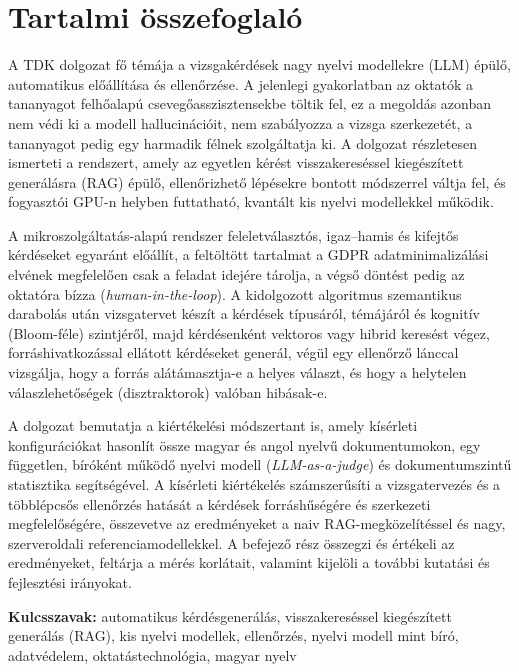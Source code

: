 \chapter*{Tartalmi összefoglaló}
\thispagestyle{plain}

A TDK dolgozat fő témája a vizsgakérdések nagy nyelvi modellekre (LLM) épülő, automatikus előállítása és
ellenőrzése. A jelenlegi gyakorlatban az oktatók a tananyagot felhőalapú csevegőasszisztensekbe töltik fel, ez
a megoldás azonban nem védi ki a modell hallucinációit, nem szabályozza a vizsga szerkezetét, a tananyagot
pedig egy harmadik félnek szolgáltatja ki. A dolgozat részletesen ismerteti a \Mimir{} rendszert, amely az
egyetlen kérést visszakereséssel kiegészített generálásra (RAG) épülő, ellenőrizhető lépésekre bontott
módszerrel váltja fel, és fogyasztói GPU-n helyben futtatható, kvantált kis nyelvi modellekkel működik.

A mikroszolgáltatás-alapú rendszer feleletválasztós, igaz--hamis és kifejtős kérdéseket egyaránt előállít, a
feltöltött tartalmat a GDPR adatminimalizálási elvének megfelelően csak a feladat idejére tárolja, a végső
döntést pedig az oktatóra bízza (\emph{human-in-the-loop}). A kidolgozott algoritmus szemantikus darabolás után
vizsgatervet készít a kérdések típusáról, témájáról és kognitív (Bloom-féle) szintjéről, majd kérdésenként vektoros
vagy hibrid keresést végez, forráshivatkozással ellátott kérdéseket generál, végül egy ellenőrző lánccal
vizsgálja, hogy a forrás alátámasztja-e a helyes választ, és hogy a helytelen válaszlehetőségek (disztraktorok)
valóban hibásak-e.

A dolgozat bemutatja a kiértékelési módszertant is, amely kísérleti konfigurációkat hasonlít össze magyar és
angol nyelvű dokumentumokon, egy független, bíróként működő nyelvi modell (\emph{LLM-as-a-judge}) és
dokumentumszintű statisztika segítségével. A kísérleti kiértékelés számszerűsíti a vizsgatervezés és a
többlépcsős ellenőrzés hatását a kérdések forráshűségére és szerkezeti megfelelőségére, összevetve az
eredményeket a naiv RAG-megközelítéssel és nagy, szerveroldali referenciamodellekkel. A befejező rész összegzi
és értékeli az eredményeket, feltárja a mérés korlátait, valamint kijelöli a további kutatási és fejlesztési
irányokat.

\medskip
\noindent\textbf{Kulcsszavak:} automatikus kérdésgenerálás, visszakereséssel kiegészített generálás (RAG),
kis nyelvi modellek, ellenőrzés, nyelvi modell mint bíró, adatvédelem, oktatástechnológia, magyar nyelv
